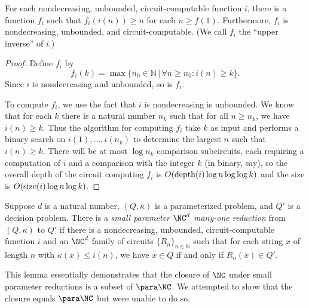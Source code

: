 \begin{lemma}\label{lem:upperinverse}
  For each nondecreasing, unbounded, circuit-computable function $i$, there is a function $f_i$ such that $f_i(i(n)) \geq n$ for each $n \geq f(1)$.
  Furthermore, $f_i$ is nondecreasing, unbounded, and circuit-computable.
  (We call $f_i$ the ``upper inverse'' of $i$.)
\end{lemma}
\begin{proof}
  Define $f_i$ by
  \[
  f_i(k) = \max\{ n_0 \in \mathbb{N} \, | \, \forall n \geq n_0 \colon i(n) \geq k \}.
  \]
  Since $i$ is nondecreasing and unbounded, so is $f_i$.

  To compute $f_i$, we use the fact that $i$ is nondecreasing is unbounded.
  We know that for each $k$ there is a natural number $n_k$ such that for all $n \geq n_k$, we have $i(n) \geq k$.
  Thus the algorithm for computing $f_i$ take $k$ as input and performs a binary search on $i(1), \dotsc, i(n_k)$ to determine the largest $n$ such that $i(n) \geq k$.
  There will be at most $\log n_k$ comparison subcircuits, each requiring a computation of $i$ and a comparison with the integer $k$ (in binary, say), so the overall depth of the circuit computing $f_i$ is $O(\operatorname{depth}(i) \log n \log \log k)$ and the size is $O(\operatorname{size}(i) \log n \log k)$.
\end{proof}

\begin{definition}\label{def:spreduction}
  Suppose $d$ is a natural number, $(Q, \kappa)$ is a parameterized problem, and $Q'$ is a decision problem.
  There is a \emph{small parameter $\NC^d$ many-one reduction} from $(Q, \kappa)$ to $Q'$ if there is a nondecreasing, unbounded, circuit-computable function $i$ and an $\NC^d$ family of circuits $\{R_n\}_{n \in \mathbb{N}}$ such that for each string $x$ of length $n$ with $\kappa(x) \leq i(n)$, we have $x \in Q$ if and only if $R_n(x) \in Q'$.
\end{definition}

This lemma essentially demonstrates that the closure of $\NC$ under small parameter reductions is a subset of $\para \NC$.
We attempted to show that the closure equals $\para \NC$ but were unable to do so.

